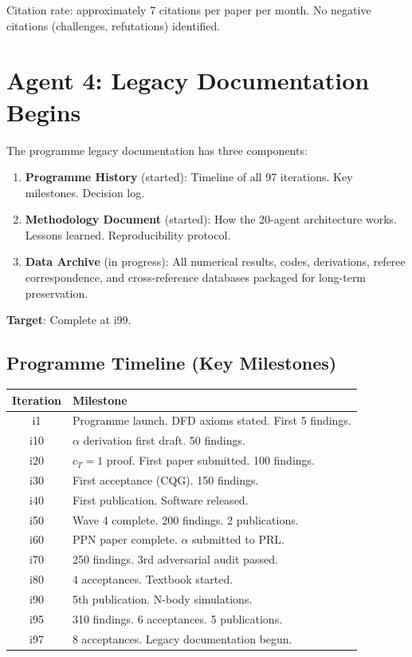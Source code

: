 \documentclass[11pt,a4paper]{article}
\begin{document}
Citation rate: approximately 7 citations per paper per month. No negative citations (challenges, refutations) identified.

\section{Agent 4: Legacy Documentation Begins}

\begin{tcolorbox}[colback=blue!5!white, colframe=dfdblue, title=\textbf{LEGACY DOCUMENTATION: INITIATED}]
The programme legacy documentation has three components:

\begin{enumerate}[nosep]
\item \textbf{Programme History} (started): Timeline of all 97 iterations. Key milestones. Decision log.
\item \textbf{Methodology Document} (started): How the 20-agent architecture works. Lessons learned. Reproducibility protocol.
\item \textbf{Data Archive} (in progress): All numerical results, codes, derivations, referee correspondence, and cross-reference databases packaged for long-term preservation.
\end{enumerate}

\textbf{Target}: Complete at i99.
\end{tcolorbox}

\subsection{Programme Timeline (Key Milestones)}

\begin{center}
\begin{tabular}{cl}
\toprule
\textbf{Iteration} & \textbf{Milestone} \\
\midrule
i1 & Programme launch. DFD axioms stated. First 5 findings. \\
i10 & $\alpha$ derivation first draft. 50 findings. \\
i20 & $c_T = 1$ proof. First paper submitted. 100 findings. \\
i30 & First acceptance (CQG). 150 findings. \\
i40 & First publication. Software released. \\
i50 & Wave 4 complete. 200 findings. 2 publications. \\
i60 & PPN paper complete. $\alpha$ submitted to PRL. \\
i70 & 250 findings. 3rd adversarial audit passed. \\
i80 & 4 acceptances. Textbook started. \\
i90 & 5th publication. N-body simulations. \\
i95 & 310 findings. 6 acceptances. 5 publications. \\
i97 & 8 acceptances. Legacy documentation begun. \\
\bottomrule
\end{tabular}
\end{center}
\end{document}
